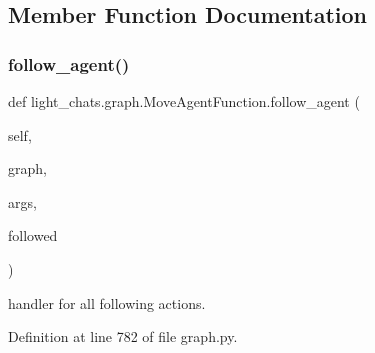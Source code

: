\subsection{Member Function Documentation}
\mbox{\label{classlight__chats_1_1graph_1_1MoveAgentFunction_adc15ccac3181a680d240e768a37b569e}} 
\subsubsection{\texorpdfstring{follow\+\_\+agent()}{follow\_agent()}}
{\footnotesize\ttfamily def light\+\_\+chats.\+graph.\+Move\+Agent\+Function.\+follow\+\_\+agent (\begin{DoxyParamCaption}\item[{}]{self,  }\item[{}]{graph,  }\item[{}]{args,  }\item[{}]{followed }\end{DoxyParamCaption})}

\begin{DoxyVerb}handler for all following actions.
\end{DoxyVerb}
 

Definition at line 782 of file graph.\+py.


